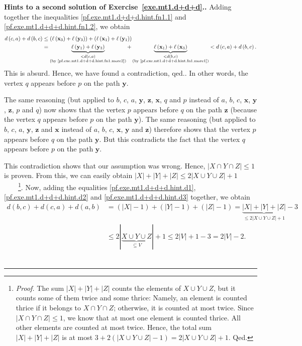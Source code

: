 \documentclass[numbers=enddot,12pt,final,onecolumn,notitlepage]{scrartcl}%
\theoremstyle{definition}
\newenvironment{proof}[1][Proof]{\noindent\textbf{#1.} }{\ \rule{0.5em}{0.5em}}
\newcommand{\abs}[1]{\left| #1 \right|}
\newcommand{\tup}[1]{\left( #1 \right)}
\begin{document}
\begin{proof}[Hints to a second solution of Exercise~\ref{exe.mt1.d+d+d}.]
{Adding together the inequalities \eqref{pf.exe.mt1.d+d+d.hint.fn1.1}
and \eqref{pf.exe.mt1.d+d+d.hint.fn1.2}, we obtain
\begin{align*}
d \tup{c, a} + d \tup{b, c}
&\leq \tup{\ell\tup{\mathbf{x}_3} + \ell\tup{\mathbf{y}_3}}
      + \tup{\ell\tup{\mathbf{x}_1} + \ell\tup{\mathbf{y}_1}} \\
&=
  \underbrace{ \ell\tup{\mathbf{y}_1}
               + \ell\tup{\mathbf{y}_3} }
             _{\substack{< d\tup{c, a} \\
                 \text{(by \eqref{pf.exe.mt1.d+d+d.hint.fn1.more2})}}}
+ \underbrace{ \ell\tup{\mathbf{x}_1}
               + \ell\tup{\mathbf{x}_3} }
             _{\substack{< d\tup{b, c} \\
                 \text{(by \eqref{pf.exe.mt1.d+d+d.hint.fn1.more1})}}}
< d \tup{c, a} + d \tup{b, c}.
\end{align*}
This is absurd. Hence, we have found a contradiction, qed.}.
In other words, the vertex $q$ appears before $p$ on the path
$\mathbf{y}$.

The same reasoning (but applied to $b$, $c$, $a$, $\mathbf{y}$,
$\mathbf{z}$, $\mathbf{x}$, $q$ and $p$ instead of $a$, $b$, $c$,
$\mathbf{x}$, $\mathbf{y}$, $\mathbf{z}$, $p$ and $q$) now shows that
the vertex $p$ appears before $q$ on the path $\mathbf{z}$ (because
the vertex $q$ appears before $p$ on the path $\mathbf{y}$). The same
reasoning (but applied to $b$, $c$, $a$, $\mathbf{y}$,
$\mathbf{z}$ and $\mathbf{x}$ instead of $a$, $b$, $c$,
$\mathbf{x}$, $\mathbf{y}$ and $\mathbf{z}$) therefore shows
that the vertex $p$ appears before $q$ on the path $\mathbf{y}$. But
this contradicts the fact that the vertex $q$ appears before $p$ on
the path $\mathbf{y}$.

This contradiction shows that our assumption was wrong. Hence,
$\abs{X \cap Y \cap Z} \leq 1$ is proven. From this, we can easily
obtain $\abs{X} + \abs{Y} + \abs{Z} \leq 2 \abs{X \cup Y \cup Z} + 1$
\ \ \ \ \footnote{\textit{Proof.} The sum
$\abs{X} + \abs{Y} + \abs{Z}$ counts the elements of
$X \cup Y \cup Z$, but it counts some of them twice and some thrice:
Namely, an element is counted thrice if it belongs to
$X \cap Y \cap Z$; otherwise, it is counted at most twice. Since
$\abs{X \cap Y \cap Z} \leq 1$, we know that at most one element is
counted thrice. All other elements are counted at most twice. Hence,
the total sum $\abs{X} + \abs{Y} + \abs{Z}$ is at most
$3 + 2 \tup{\abs{X \cup Y \cup Z} - 1} = 2 \abs{X \cup Y \cup Z} + 1$.
Qed.}. Now, adding the equalities
\eqref{pf.exe.mt1.d+d+d.hint.d1}, \eqref{pf.exe.mt1.d+d+d.hint.d2}
and \eqref{pf.exe.mt1.d+d+d.hint.d3} together, we obtain
\begin{align*}
d \tup{b, c} + d \tup{c, a} + d \tup{a, b}
&= \tup{\abs{X} - 1} + \tup{\abs{Y} - 1} + \tup{\abs{Z} - 1}
= \underbrace{\abs{X} + \abs{Y} + \abs{Z}}
             _{\leq 2 \abs{X \cup Y \cup Z} + 1}
  - 3 \\
&\leq 2 \abs{\underbrace{X \cup Y \cup Z}_{\subseteq V}} + 1
\leq 2 \abs{V} + 1 - 3 = 2 \abs{V} - 2.
\end{align*}
\end{proof}
\end{document}
